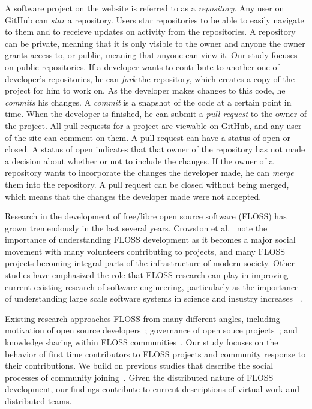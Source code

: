 \documentclass{iitthesis}
\begin{document}
 \label{sec:terms}

A software project on the website is referred to as a \textit{repository}. Any
user on GitHub can \textit{star} a repository. Users star repositories to be
able to easily navigate to them and to receieve updates on activity from the
repositories. A repository can be private, meaning that it is only visible to
the owner and anyone the owner grants access to, or public, meaning that anyone
can view it. Our study focuses on public repositories. If a developer wants to
contribute to another one of developer's repositories, he can \textit{fork} the
repository, which creates a copy of the project for him to work on. As the
developer makes changes to this code, he \textit{commits} his changes. A
\textit{commit} is a snapshot of the code at a certain point in time. When the
developer is finished, he can submit a \textit{pull request} to the owner of the
project. All pull requests for a project are viewable on GitHub, and any user of
the site can comment on them. A pull request can have a status of open or
closed. A status of open indicates that that owner of the repository has not
made a decision about whether or not to include the changes. If the owner of a
repository wants to incorporate the changes the developer made, he can
\textit{merge} them into the repository. A pull request can be closed without
being merged, which means that the changes the developer made were not accepted.


 \label{sec:relatedwork}

Research in the development of free/libre open source software (FLOSS) has grown
tremendously in the last several years.  Crowston et
al.~\cite{crowston_free/libre_2008} note the importance of understanding FLOSS
development as it becomes a major social movement with many volunteers
contributing to projects, and many FLOSS projects becoming integral parts of the
infrastructure of modern society. Other studies have emphasized the role that
FLOSS research can play in improving current existing research of software
engineering, particularly as the importance of understanding large scale
software systems in science and insustry increases
~\cite{scacchi_free/open_2007}.

Existing research approaches FLOSS from many different angles, including
motivation of open source
developers~\cite{fang_understanding_2009, lakhani_why_2003, shah_motivation_2006}; governance of open souce
projects~\cite{hippel_open_2003, omahony_guarding_2003, omahony_governance_2007};
and knowledge sharing within FLOSS
communities~\cite{endres_tacit_2007, hemetsberger_collective_2009, sowe_understanding_2008}.
Our study focuses on the behavior of first time contributors to FLOSS projects
and community response to their contributions. We build on previous studies that
describe the social processes of community
joining~\cite{ducheneaut_socialization_2005, huang_mining_2005, von_krogh_community_2003}. Given the
distributed nature of FLOSS development, our findings contribute to current
descriptions of virtual work and distributed teams.
\end{document}
